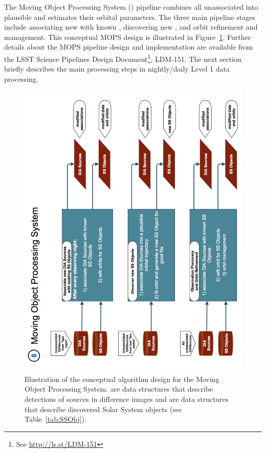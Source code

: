 The Moving Object Processing System () pipeline combines all unassociated \DIASources into
plausible \SSObjects and estimates their orbital parameters. The three main pipeline stages
include associating new \DIASources with known \SSObjects, discovering new \SSObjects,
and orbit refinement and management. This conceptual MOPS design is illustrated in
Figure~\ref{fig:Pipe8}. Further details about the MOPS pipeline design and implementation are available
from the LSST Science Pipelines Design Document\footnote{See \url{http://ls.st/LDM-151}}, LDM-151.
The next section briefly describes the main processing steps in nightly/daily Level 1 data processing.

\begin{figure}[!t]
    \centering
    \includegraphics[scale=0.60, angle=270]{MOPS-Level0}
    \vskip -0.1in
    \caption{Illustration of the conceptual algorithm design for the Moving Object Processing System.
   \DIASources are data structures that describe detections of sources in difference images and
   \SSObjects are data structures that describe discovered Solar System objects (see Table~\ref{tab:SSObj}).
\label{fig:Pipe8}}
\end{figure}


